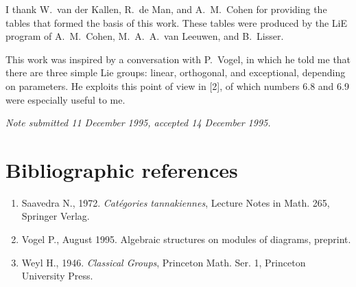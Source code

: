\documentclass[11pt,a4paper]{article}
\begin{document}
I thank W.~van der Kallen, R.~de Man, and A.~M.~Cohen for providing the tables that formed the basis of this work. These tables were produced by the LiE program of A.~M.~Cohen, M.~A.~A.~van Leeuwen, and B.~Lisser.

This work was inspired by a conversation with P.~Vogel, in which he told me that there are three simple Lie groups: linear, orthogonal, and exceptional, depending on parameters. He exploits this point of view in [2], of which numbers 6.8 and 6.9 were especially useful to me.

\smallskip
\noindent\textit{Note submitted 11 December 1995, accepted 14 December 1995.}

\section*{Bibliographic references}
\begin{enumerate}
\item[{[1]}] Saavedra N., 1972. \textit{Cat\'egories tannakiennes}, Lecture Notes in Math. 265, Springer Verlag.
\item[{[2]}] Vogel P., August 1995. Algebraic structures on modules of diagrams, preprint.
\item[{[3]}] Weyl H., 1946. \textit{Classical Groups}, Princeton Math. Ser. 1, Princeton University Press.
\end{enumerate}
\end{document}

